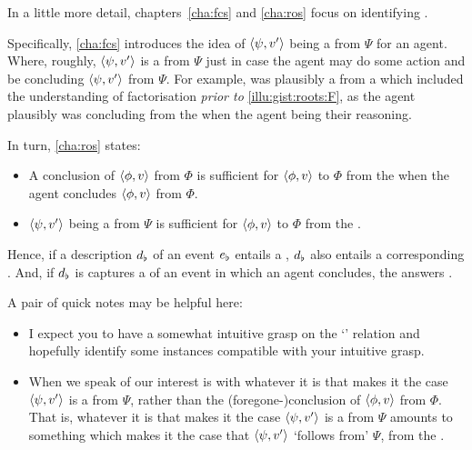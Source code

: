 \begin{note}
  In a little more detail, chapters~\ref{cha:fcs} and \ref{cha:ros} focus on identifying \fingfr{}.

  Specifically, \autoref{cha:fcs} introduces the idea of \(\langle\psi, v'\rangle\) being a \fc{} from \(\Psi\) for an agent.
  Where, roughly, \(\langle\psi, v'\rangle\) is a  from \(\Psi\) just in case the agent may do some action and be concluding \(\langle\psi, v'\rangle\) from \(\Psi\).
  For example,  was plausibly a \fc{} from a \pool{} which included the \agents{} understanding of factorisation \emph{prior to} \autoref{illu:gist:roots:F}, as the agent plausibly was concluding  from the \pool{} when the agent being their reasoning.

  In turn, \autoref{cha:ros} states:
  \begin{itemize}
  \item
    A conclusion of \(\langle\phi, v\rangle\) from \(\Phi\) is sufficient for \(\langle\phi, v\rangle\) to \fof{} \(\Phi\) from the \agpe{} when the agent concludes \(\langle\phi, v\rangle\) from \(\Phi\).
  \item
    \(\langle\psi, v'\rangle\) being a \fc{} from \(\Psi\) is sufficient for \(\langle\phi, v\rangle\) to \fof{} \(\Phi\) from the \agpe{}.
  \end{itemize}
  Hence, if a description \(d\sb{\flat}\) of an event \(e\sb{\flat}\) entails a , \(d\sb{\flat}\) also entails a corresponding \fingfr{}.
  And, if \(d\sb{\flat}\) is captures a \se{} of an event in which an agent concludes, the \fingfr{} answers \qWhy{}.

  A pair of quick notes may be helpful here:

  \begin{itemize}
  \item
    I expect you to have a somewhat intuitive grasp on the `\fof{}' relation and  hopefully identify some instances compatible with your intuitive grasp.
  \item
    When we speak of  our interest is with whatever it is that makes it the case \(\langle\psi, v'\rangle\) is a \fc{} from \(\Psi\), rather than the (foregone-)conclusion of \(\langle\phi, v\rangle\) from \(\Phi\).
    That is, whatever it is that makes it the case \(\langle\psi, v'\rangle\) is a \fc{} from \(\Psi\) amounts to something which makes it the case that \(\langle\psi, v'\rangle\) `follows from' \(\Psi\), from the \agpe{}.
  \end{itemize}
\end{note}


